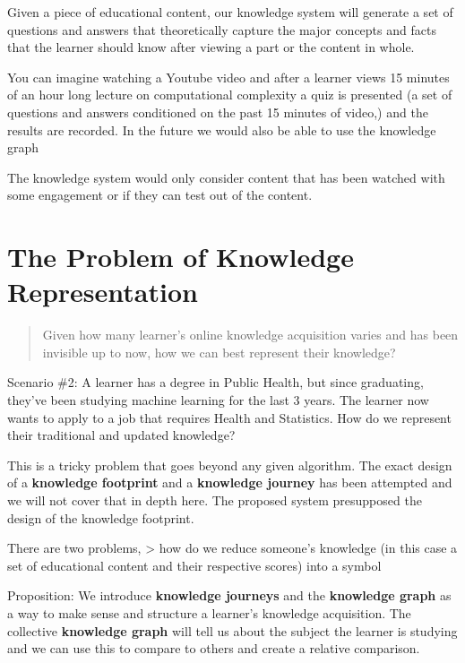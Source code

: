 \documentclass[]{book}
\theoremstyle{definition}
\theoremstyle{definition}
\theoremstyle{definition}
\theoremstyle{remark}
\begin{document}
Given a piece of educational content, our knowledge system will generate
a set of questions and answers that theoretically capture the major
concepts and facts that the learner should know after viewing a part or
the content in whole.

You can imagine watching a Youtube video and after a learner views 15
minutes of an hour long lecture on computational complexity a quiz is
presented (a set of questions and answers conditioned on the past 15
minutes of video,) and the results are recorded. In the future we would
also be able to use the knowledge graph

The knowledge system would only consider content that has been watched
with some engagement or if they can test out of the content.

\section{The Problem of Knowledge
Representation}\label{the-problem-of-knowledge-representation}

\begin{quote}
Given how many learner's online knowledge acquisition varies and has
been invisible up to now, how we can best represent their knowledge?
\end{quote}

Scenario \#2: A learner has a degree in Public Health, but since
graduating, they've been studying machine learning for the last 3 years.
The learner now wants to apply to a job that requires Health and
Statistics. How do we represent their traditional and updated knowledge?

This is a tricky problem that goes beyond any given algorithm. The exact
design of a \textbf{knowledge footprint} and a \textbf{knowledge
journey} has been attempted and we will not cover that in depth here.
The proposed system presupposed the design of the knowledge footprint.

There are two problems, \textgreater{} how do we reduce someone's
knowledge (in this case a set of educational content and their
respective scores) into a symbol

Proposition: We introduce \textbf{knowledge journeys} and the
\textbf{knowledge graph} as a way to make sense and structure a
learner's knowledge acquisition. The collective \textbf{knowledge graph}
will tell us about the subject the learner is studying and we can use
this to compare to others and create a relative comparison.
\end{document}
